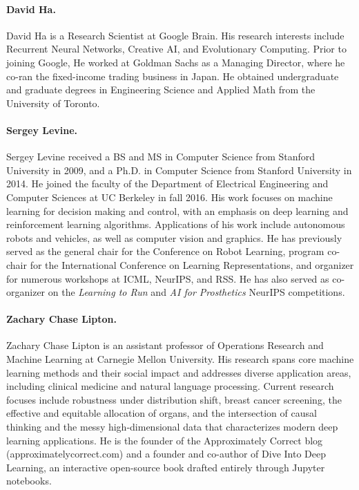 \paragraph{David Ha.} David Ha 
is a Research Scientist at Google Brain. His research interests include Recurrent Neural Networks, Creative AI, and Evolutionary Computing. Prior to joining Google, He worked at Goldman Sachs as a Managing Director, where he co-ran the fixed-income trading business in Japan. He obtained undergraduate and graduate degrees in Engineering Science and Applied Math from the University of Toronto. 
 
\paragraph{Sergey Levine.} Sergey Levine received a BS and MS in Computer Science from Stanford University in 2009, and a Ph.D. in Computer Science from Stanford University in 2014. He joined the faculty of the Department of Electrical Engineering and Computer Sciences at UC Berkeley in fall 2016. His work focuses on machine learning for decision making and control, with an emphasis on deep learning and reinforcement learning algorithms. Applications of his work include autonomous robots and vehicles, as well as computer vision and graphics. He has previously served as the general chair for the Conference on Robot Learning, program co-chair for the International Conference on Learning Representations, and organizer for numerous workshops at ICML, NeurIPS, and RSS. He has also served as co-organizer on the \emph{Learning to Run} and \emph{AI for Prosthetics} NeurIPS competitions.

\paragraph{Zachary Chase Lipton.} 
Zachary Chase Lipton is an assistant professor of Operations Research and Machine Learning at Carnegie Mellon University. His research spans core machine learning methods and their social impact and addresses diverse application areas, including clinical medicine and natural language processing. Current research focuses include robustness under distribution shift, breast cancer screening, the effective and equitable allocation of organs, and the intersection of causal thinking and the messy high-dimensional data that characterizes modern deep learning applications. He is the founder of the Approximately Correct blog (approximatelycorrect.com) and a founder and co-author of Dive Into Deep Learning, an interactive open-source book drafted entirely through Jupyter notebooks.


